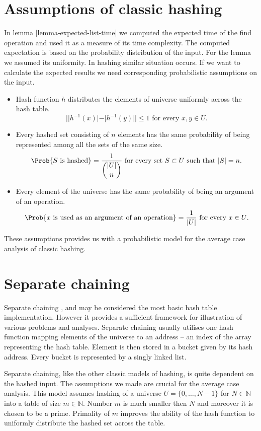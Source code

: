 \section{Assumptions of classic hashing}
In lemma \ref{lemma-expected-list-time} we computed the expected time of the find operation and used it as a measure of its time complexity. The computed expectation is based on the probability distribution of the input. For the lemma we assumed its uniformity. In hashing similar situation occurs. If we want to calculate the expected results we need corresponding probabilistic assumptions on the input.
\begin{itemize}
\item Hash function $h$ distributes the elements of universe uniformly across the hash table.
\[
||h^{-1}(x)| - |h^{-1}(y)|| \leq 1 \text{ for every }x, y \in U \text{.}
\]
\item Every hashed set consisting of $n$ elements has the same probability of being represented among all the sets of the same size.
\[
\Prob{S \text{ is hashed}} = \frac{1}{\dbinom{|U|}{n}} \text{ for every set } S \subset U \text{ such that } |S| = n \text{.}
\]
\item Every element of the universe has the same probability of being an argument of an operation.
\[
\Prob{x \text{ is used as an argument of an operation}} = \frac{1}{|U|} \text{ for every } x \in U \text{.}
\]
\end{itemize}

These assumptions provides us with a probabilistic model for the average case analysis of classic hashing.

\section{Separate chaining}
Separate chaining \cite{The-art-of-computer-programming}, \cite{DBLP:books/sp/Mehlhorn84} and \cite{DBLP:books/sp/MehlhornS2008} may be considered the most basic hash table implementation. However it provides a sufficient framework for illustration of various problems and analyses. Separate chaining usually utilises one hash function mapping elements of the universe to an address -- an index of the array representing the hash table. Element is then stored in a bucket given by its hash address. Every bucket is represented by a singly linked list. 

Separate chaining, like the other classic models of hashing, is quite dependent on the hashed input. The assumptions we made are crucial for the average case analysis. This model assumes hashing of a universe $U = \{0, \dots, N - 1\}$ for $N \in \mathbb{N}$ into a table of size $m \in \mathbb{N}$. Number $m$ is much smaller then $N$ and moreover it is chosen to be a prime. Primality of $m$ improves the ability of the hash function to uniformly distribute the hashed set across the table. 

